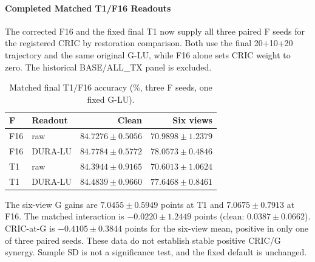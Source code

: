 \paragraph{Completed Matched T1/F16 Readouts}

The corrected F16 and the fixed final T1 now supply all three paired F seeds for the registered CRIC by restoration comparison. Both use the final 20+10+20 trajectory and the same original G-LU, while F16 alone sets CRIC weight to zero. The historical BASE/ALL\_TX panel is excluded.

\begin{table}[t]

\centering\scriptsize

\caption{Matched final T1/F16 accuracy (\%, three F seeds, one fixed G-LU).}

\label{tab:F16-factorial}

\setlength{\tabcolsep}{3pt}

\begin{tabular}{llrr}

\toprule

F & Readout & Clean & Six views \\

\midrule

F16 & raw & $84.7276\pm0.5056$ & $70.9898\pm1.2379$ \\

F16 & DURA-LU & $84.7784\pm0.5772$ & $78.0573\pm0.4846$ \\

T1 & raw & $84.3944\pm0.9165$ & $70.6013\pm1.0624$ \\

T1 & DURA-LU & $84.4839\pm0.9660$ & $77.6468\pm0.8461$ \\

\bottomrule

\end{tabular}

\end{table}

The six-view G gains are $7.0455\pm0.5949$ points at T1 and $7.0675\pm0.7913$ at F16. The matched interaction is $-0.0220\pm1.2449$ points (clean: $0.0387\pm0.0662$). CRIC-at-G is $-0.4105\pm0.3844$ points for the six-view mean, positive in only one of three paired seeds. These data do not establish stable positive CRIC/G synergy. Sample SD is not a significance test, and the fixed default is unchanged.
